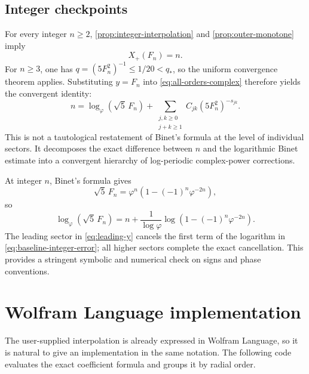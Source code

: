 \documentclass[11pt,oneside]{article}
\numberwithin{equation}{section}
\theoremstyle{plain}
\theoremstyle{definition}
\theoremstyle{remark}
\begin{document}
\subsection{Integer checkpoints}

For every integer \(n\ge2\), \cref{prop:integer-interpolation} and
\cref{prop:outer-monotone} imply
\begin{equation}\label{eq:integer-checkpoint}
 X_+(F_n)=n.
\end{equation}
For \(n\ge3\), one has \(q=(5F_n^2)^{-1}\le1/20<q_*\), so the
uniform convergence theorem applies.  Substituting \(y=F_n\) into
\cref{eq:all-orders-complex} therefore yields the convergent identity:
\begin{equation}\label{eq:integer-transseries-identity}
 n=\log_{\varphi}(\sqrt5\,F_n)
 +\sum_{\substack{j,k\ge0\\j+k\ge1}}
 C_{jk}(5F_n^2)^{-s_{jk}}.
\end{equation}
This is not a tautological restatement of Binet's formula at the level of
individual sectors.  It decomposes the exact difference between \(n\) and
the logarithmic Binet estimate into a convergent hierarchy of log-periodic
complex-power corrections.

At integer \(n\), Binet's formula gives
\[
 \sqrt5\,F_n=\varphi^n\left(1-(-1)^n\varphi^{-2n}\right),
\]
so
\begin{equation}\label{eq:baseline-integer-error}
 \log_{\varphi}(\sqrt5\,F_n)
 =n+\frac1{\log\varphi}
 \log\!\left(1-(-1)^n\varphi^{-2n}\right).
\end{equation}
The leading sector in \cref{eq:leading-y} cancels the first term of the
logarithm in \cref{eq:baseline-integer-error}; all higher sectors complete
the exact cancellation.  This provides a stringent symbolic and numerical
check on signs and phase conventions.

\section{Wolfram Language implementation}\label{sec:wl}

The user-supplied interpolation is already expressed in Wolfram Language,
so it is natural to give an implementation in the same notation.  The
following code evaluates the exact coefficient formula and groups it by
radial order.
\end{document}
